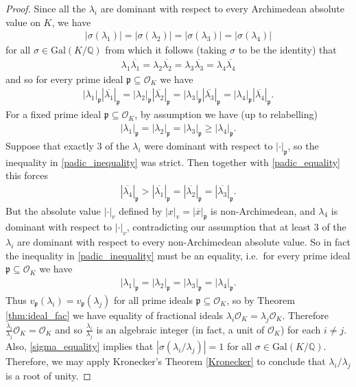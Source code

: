 \documentclass{theoretics}
\newcommand{\Q}{\mathbb{Q}}
\newcommand{\p}{\mathfrak{p}}
\renewcommand{\O}{\mathcal{O}}
\begin{document}
\begin{proof}
	Since all the $\lambda_i$ are dominant with respect to every Archimedean absolute value on $K$, we have
	\begin{align} \label{sigma_equality}
		|\sigma(\lambda_1)| = |\sigma(\lambda_2)| = |\sigma(\lambda_3)| = |\sigma(\lambda_4)|
	\end{align}
	for all $\sigma \in \text{Gal}(K/\Q)$ from which it follows (taking $\sigma$ to be the identity) that
	\begin{align*}
		\lambda_1 \overline{\lambda_1} = \lambda_2 \overline{\lambda_2} = \lambda_3 \overline{\lambda_3} = \lambda_4 \overline{\lambda_4}
	\end{align*}
	and so for every prime ideal $\p \subseteq \O_K$ we have
	\begin{align} \label{padic_equality}
		|\lambda_1|_\p |\overline{\lambda_1}|_\p = |\lambda_2|_\p |\overline{\lambda_2}|_\p = |\lambda_3|_\p |\overline{\lambda_3}|_\p = |\lambda_4|_\p |\overline{\lambda_4}|_\p.
	\end{align}
	For a fixed prime ideal $\p \subseteq \O_K$, by assumption we have (up to relabelling)
	\begin{align} \label{padic_inequality} 
		|\lambda_1|_\p = |\lambda_2|_\p = |\lambda_3|_\p \geq |\lambda_4|_\p.
	\end{align}
	Suppose that exactly 3 of the $\lambda_i$ were dominant with respect to $|\cdot|_\p$, so the inequality in \eqref{padic_inequality} was strict. Then together with \eqref{padic_equality} this forces
	\begin{align*}
		|\overline{\lambda_4}|_\p > |\overline{\lambda_1}|_\p = |\overline{\lambda_2}|_\p = |\overline{\lambda_3}|_\p.
	\end{align*}
	But the absolute value $|\cdot|_v$ defined by $|x|_v = |\overline{x}|_\p$ is non-Archimedean, and $\lambda_4$ is dominant with respect to $|\cdot|_v$, contradicting our assumption that at least 3 of the $\lambda_i$ are dominant with respect to every non-Archimedean absolute value. So in fact the inequality in \eqref{padic_inequality} must be an equality, i.e.\ for every prime ideal $\p \subseteq \O_K$ we have
	\begin{align*}
		|\lambda_1|_\p = |\lambda_2|_\p = |\lambda_3|_\p = |\lambda_4|_\p.
	\end{align*}
	Thus $v_\p(\lambda_i) = v_\p(\lambda_j)$ for all prime ideals $\p \subseteq \O_K$, so by Theorem \ref{thm:ideal_fac} we have equality of fractional ideals $\lambda_i \O_K = \lambda_j \O_K$. Therefore $\frac{\lambda_i}{\lambda_j} \O_K = \O_K$ and so $\frac{\lambda_i}{\lambda_j}$ is an algebraic integer (in fact, a unit of $\O_K$) for each $i \neq j$. Also, \eqref{sigma_equality} implies that $\left|\sigma\left(\lambda_i/\lambda_j\right)\right| = 1$ for all $\sigma \in \text{Gal}(K/\Q)$. Therefore, we may apply Kronecker's Theorem \ref{Kronecker} to conclude that $\lambda_i/\lambda_j$ is a root of unity.
\end{proof}
\end{document}
